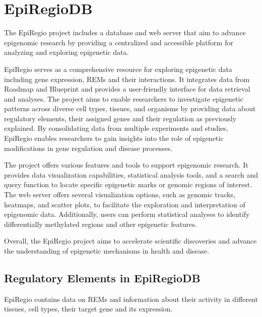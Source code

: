 \documentclass[pdftex,12pt,a4paper]{report}
\begin{document}
\section{EpiRegioDB}
The EpiRegio\cite{Epi} project includes a database and web server that aim to advance
epigenomic research by providing a centralized and accessible platform for analyzing and
exploring epigenetic data. 

EpiRegio serves as a comprehensive resource for exploring epigenetic data including gene expression, REMs and their interactions. It integrates data from Roadmap\cite{roadmap} and Blueprint\cite{blueprint} and provides a user-friendly interface for data retrieval and analyses. The project aims to enable researchers to investigate epigenetic patterns across diverse cell types, tissues, and organisms by providing data about regulatory elements, their assigned genes and their regulation as previously explained. By consolidating data from multiple experiments and studies, EpiRegio enables researchers to gain insights into the role of epigenetic modifications in gene regulation and disease processes.

The project offers various features and tools to support epigenomic research. It provides data visualization capabilities, statistical analysis tools, and a search and query function to locate specific epigenetic marks or genomic regions of interest. The web server offers several visualization options, such as genomic tracks, heatmaps, and scatter plots, to facilitate the exploration and interpretation of epigenomic data. Additionally, users can perform statistical analyses to identify differentially methylated regions and other epigenetic features.

Overall, the EpiRegio project aims to accelerate scientific discoveries and advance the understanding of epigenetic mechanisms in health and disease.


\subsection{Regulatory Elements in EpiRegioDB}
EpiRegio contains data on REMs and information about their activity in different tissues, cell types, their target gene and its expression\cite{regelements}. 
\end{document}
